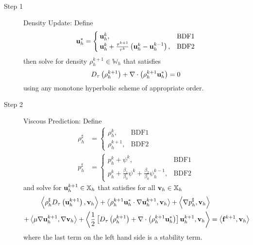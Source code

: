 \documentclass[letterpaper]{erdc}
\begin{document}
\begin{description}
\item[Step 1] Density Update: Define
\begin{equation}
  \textbf{u}_h^{*} = \begin{cases}
                \textbf{u}_h^{k}, & \mbox{BDF1} \\
                \textbf{u}_h^{k} + \frac{\tau^{k+1}}{\tau^k}\left( \textbf{u}_h^{k} - \textbf{u}_h^{k-1}\right), & \mbox{BDF2} 
               \end{cases}
 \end{equation}
then solve for density $\rho_h^{k+1}\in \mathbb{W}_h$ that satisfies
\begin{equation}\label{eqn:generaldensity}
D_{\tau}\left(\rho_h^{k+1}\right) + \nabla\cdot\left( \rho_h^{k+1}\textbf{u}_h^{*} \right) = 0
\end{equation}
using any monotone hyperbolic scheme of appropriate order. 

\item[Step 2] Viscous Prediction: Define
\begin{align}
  \rho_h^{\sharp} &= \begin{cases}
                       \rho_h^{k}, & \mbox{BDF1} \\
                       \rho_h^{k+1}, & \mbox{BDF2} 
                      \end{cases}\\
  p_h^{\sharp} &= \begin{cases}
                  p_h^{k} + \psi^{k}, & \mbox{BDF1}\\ 
                  p_h^{k} + \frac{\beta_1}{\beta_0}\psi^{k} + \frac{\beta_2}{\beta_0}\psi_h^{k-1}, & \mbox{BDF2} 
                 \end{cases}
\end{align}
and solve for $\textbf{u}_h^{k+1}\in\mathbb{X}_h$ that satisfies for all $\textbf{v}_h\in\mathbb{X}_h$
\begin{equation}\label{eqn:generalvelocity}
  \begin{split}
    \left\langle \rho_h^{\sharp}D_{\tau}\left(\textbf{u}_h^{k+1}\right), \textbf{v}_h \right\rangle  + \left\langle \rho_h^{k+1}\textbf{u}_h^{*}\cdot\nabla\textbf{u}_h^{k+1}, \textbf{v}_h \right\rangle +\left\langle \nabla p_h^{\sharp}, \textbf{v}_h \right\rangle &\\
     + \left\langle \mu\nabla\textbf{u}_h^{k+1}, \nabla\textbf{v}_h \right\rangle  + \left\langle \frac{1}{2}\left[ D_{\tau}\left(\rho_h^{k+1}\right) + \nabla\cdot\left( \rho_h^{k+1}\textbf{u}_h^{*} \right)\right] \textbf{u}_h^{k+1}, \textbf{v}_h \right\rangle &= \left\langle \mathbf{f}^{k+1}, \textbf{v}_h \right\rangle
  \end{split}
\end{equation}
where the last term on the left hand side is a stability term.  


\end{description}
\end{document}
